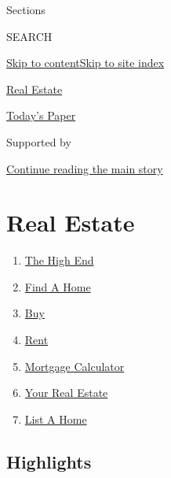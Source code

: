 Sections

SEARCH

\protect\hyperlink{site-content}{Skip to
content}\protect\hyperlink{site-index}{Skip to site index}

\href{https://www.nytimes3xbfgragh.onion/section/realestate}{Real
Estate}

\href{https://myaccount.nytimes3xbfgragh.onion/auth/login?response_type=cookie\&client_id=vi}{}

\href{https://www.nytimes3xbfgragh.onion/section/todayspaper}{Today's
Paper}

Supported by

\protect\hyperlink{after-sponsor}{Continue reading the main story}

\hypertarget{real-estate}{%
\section{Real Estate}\label{real-estate}}

\begin{enumerate}
\def\labelenumi{\arabic{enumi}.}
\tightlist
\item
  \href{/realestate/the-high-end}{The High End}
\item
  \href{/real-estate/find-a-home}{Find A Home}
\item
  \href{/real-estate/homes-for-sale}{Buy}
\item
  \href{/real-estate/homes-for-rent}{Rent}
\item
  \href{/real-estate/mortgage-calculator}{Mortgage Calculator}
\item
  \href{/real-estate/my-real-estate}{Your Real Estate}
\item
  \href{https://nytimesads.gtspayments.com/}{List A Home}
\end{enumerate}

\hypertarget{highlights}{%
\subsection{Highlights}\label{highlights}}

